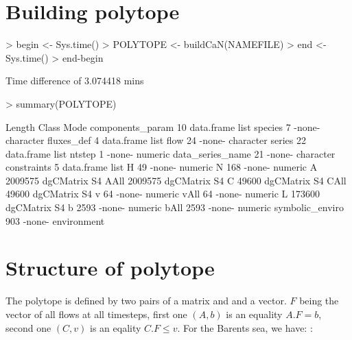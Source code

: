 \documentclass{article}
\begin{document}
\section{Building polytope}

\begin{Schunk}
\begin{Sinput}
> begin <- Sys.time()
> POLYTOPE <- buildCaN(NAMEFILE)
> end <- Sys.time()
> end-begin
\end{Sinput}
\begin{Soutput}
Time difference of 3.074418 mins
\end{Soutput}
\begin{Sinput}
> summary(POLYTOPE)
\end{Sinput}
\begin{Soutput}
                 Length  Class      Mode       
components_param      10 data.frame list       
species                7 -none-     character  
fluxes_def             4 data.frame list       
flow                  24 -none-     character  
series                22 data.frame list       
ntstep                 1 -none-     numeric    
data_series_name      21 -none-     character  
constraints            5 data.frame list       
H                     49 -none-     numeric    
N                    168 -none-     numeric    
A                2009575 dgCMatrix  S4         
AAll             2009575 dgCMatrix  S4         
C                  49600 dgCMatrix  S4         
CAll               49600 dgCMatrix  S4         
v                     64 -none-     numeric    
vAll                  64 -none-     numeric    
L                 173600 dgCMatrix  S4         
b                   2593 -none-     numeric    
bAll                2593 -none-     numeric    
symbolic_enviro      903 -none-     environment
\end{Soutput}
\end{Schunk}

\section{Structure of polytope}

The polytope is defined by two pairs of a matrix and and a vector. $F$ being the vector of all flows at all timesteps, first one $(A,b)$ is an equality $ A.F = b$, second one $(C,v)$ is an eqality  $ C.F \le v$. For the Barents sea, we have: :
\end{document}

